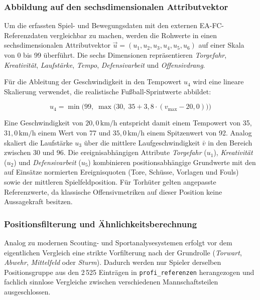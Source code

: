\subsubsection{Abbildung auf den sechsdimensionalen Attributvektor}

Um die erfassten Spiel- und Bewegungsdaten mit den externen EA-FC-Referenzdaten
vergleichbar zu machen, werden die Rohwerte in einen sechsdimensionalen
Attributvektor $\vec{u} = (u_1, u_2, u_3, u_4, u_5, u_6)$ auf einer
Skala von 0 bis 99 überführt. Die sechs Dimensionen repräsentieren
\textit{Torgefahr}, \textit{Kreativität}, \textit{Laufstärke}, \textit{Tempo},
\textit{Defensivarbeit} und \textit{Offensivdrang}.

Für die Ableitung der Geschwindigkeit in den Tempowert $u_4$ wird eine lineare
Skalierung verwendet, die realistische Fußball-Sprintwerte abbildet:

\begin{equation}
    u_4 = \min\Big(99,\; \max\big(30,\; 35 + 3{,}8 \cdot (v_{\max} - 20{,}0)\big)\Big)
    \label{eq:pace-skalierung}
\end{equation}

Eine Geschwindigkeit von $20{,}0\,\mathrm{km/h}$ entspricht damit einem
Tempowert von 35, $31{,}0\,\mathrm{km/h}$ einem Wert von 77 und
$35{,}0\,\mathrm{km/h}$ einem Spitzenwert von 92. Analog skaliert die
Laufstärke $u_3$ über die mittlere Laufgeschwindigkeit $\bar{v}$ in den Bereich
zwischen 30 und 96. Die ereignisabhängigen Attribute \textit{Torgefahr} ($u_1$),
\textit{Kreativität} ($u_2$) und \textit{Defensivarbeit} ($u_5$) kombinieren
positionsabhängige Grundwerte mit den auf Einsätze normierten Ereignisquoten
(Tore, Schüsse, Vorlagen und Fouls) sowie der mittleren Spielfeldposition. Für
Torhüter gelten angepasste Referenzwerte, da klassische Offensivmetriken auf
dieser Position keine Aussagekraft besitzen.

\subsubsection{Positionsfilterung und Ähnlichkeitsberechnung}

Analog zu modernen Scouting- und Sportanalysesystemen erfolgt vor dem
eigentlichen Vergleich eine strikte Vorfilterung nach der Grundrolle
(\textit{Torwart}, \textit{Abwehr}, \textit{Mittelfeld} oder \textit{Sturm}).
Dadurch werden nur Spieler derselben Positionsgruppe aus den 2\,525 Einträgen
in \texttt{profi\_referenzen} herangezogen und fachlich sinnlose Vergleiche
zwischen verschiedenen Mannschaftsteilen ausgeschlossen.

